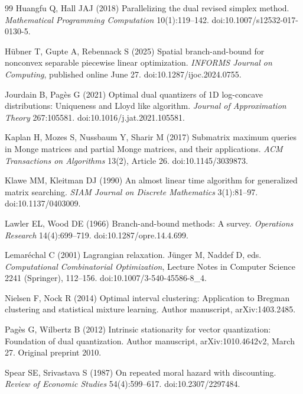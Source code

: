 \begin{thebibliography}{99}
Huangfu Q, Hall JAJ (2018) Parallelizing the dual revised simplex method. \emph{Mathematical Programming Computation} 10(1):119--142. doi:10.1007/s12532-017-0130-5.

H{\"u}bner T, Gupte A, Rebennack S (2025) Spatial branch-and-bound for nonconvex separable piecewise linear optimization. \emph{INFORMS Journal on Computing}, published online June 27. doi:10.1287/ijoc.2024.0755.

Jourdain B, Pag\`es G (2021) Optimal dual quantizers of 1D log-concave distributions: Uniqueness and Lloyd like algorithm. \emph{Journal of Approximation Theory} 267:105581. doi:10.1016/j.jat.2021.105581.

Kaplan H, Mozes S, Nussbaum Y, Sharir M (2017) Submatrix maximum queries in Monge matrices and partial Monge matrices, and their applications. \emph{ACM Transactions on Algorithms} 13(2), Article 26. doi:10.1145/3039873.

Klawe MM, Kleitman DJ (1990) An almost linear time algorithm for generalized matrix searching. \emph{SIAM Journal on Discrete Mathematics} 3(1):81--97. doi:10.1137/0403009.

Lawler EL, Wood DE (1966) Branch-and-bound methods: A survey. \emph{Operations Research} 14(4):699--719. doi:10.1287/opre.14.4.699.

Lemar\'echal C (2001) Lagrangian relaxation. J\"unger M, Naddef D, eds. \emph{Computational Combinatorial Optimization}, Lecture Notes in Computer Science 2241 (Springer), 112--156. doi:10.1007/3-540-45586-8\_4.

Nielsen F, Nock R (2014) Optimal interval clustering: Application to Bregman clustering and statistical mixture learning. Author manuscript, arXiv:1403.2485.

Pag\`es G, Wilbertz B (2012) Intrinsic stationarity for vector quantization: Foundation of dual quantization. Author manuscript, arXiv:1010.4642v2, March 27. Original preprint 2010.

Spear SE, Srivastava S (1987) On repeated moral hazard with discounting. \emph{Review of Economic Studies} 54(4):599--617. doi:10.2307/2297484.


\end{thebibliography}
